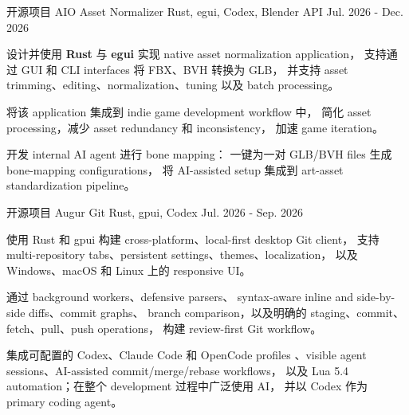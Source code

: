 \begin{cventries}
  \cventry
  {开源项目}
  {AIO Asset Normalizer}
  {Rust, egui, Codex, Blender API}
  {Jul. 2026 - Dec. 2026}
  {
    \begin{cvitems}
      \item
            {
                  设计并使用 \textbf{Rust} 与 \textbf{egui} 实现 native asset normalization application，
                  支持通过 GUI 和 CLI interfaces 将 FBX、BVH 转换为 GLB，
                  并支持 asset trimming、editing、normalization、tuning 以及 batch processing。
            }
      \item
            {
                  将该 application 集成到 indie game development workflow 中，
                  简化 asset processing，减少 asset redundancy 和 inconsistency，
                  加速 game iteration。
            }
      \item
            {
                  开发 internal AI agent 进行 bone mapping：
                  一键为一对 GLB/BVH files 生成 bone-mapping configurations，
                  将 AI-assisted setup 集成到 art-asset standardization pipeline。
            }
    \end{cvitems}
  }

  \clearpage
  \cventry
  {开源项目}
  {Augur Git}
  {Rust, gpui, Codex}
  {Jul. 2026 - Sep. 2026}
  {
    \begin{cvitems}
      \item
            {
                  使用 Rust 和 gpui 构建 cross-platform、local-first desktop Git client，
                  支持 multi-repository tabs、persistent settings、themes、localization，
                  以及 Windows、macOS 和 Linux 上的 responsive UI。
            }
      \item
            {
                  通过 background workers、defensive parsers、
                  syntax-aware inline and side-by-side diffs、commit graphs、
                  branch comparison，以及明确的 staging、commit、fetch、pull、push operations，
                  构建 review-first Git workflow。
            }
      \item
            {
                  集成可配置的 Codex、Claude Code 和 OpenCode profiles
                  、visible agent sessions、AI-assisted commit/merge/rebase workflows，
                  以及 Lua 5.4 automation；在整个 development 过程中广泛使用 AI，
                  并以 Codex 作为 primary coding agent。
            }
    \end{cvitems}
  }


\end{cventries}
